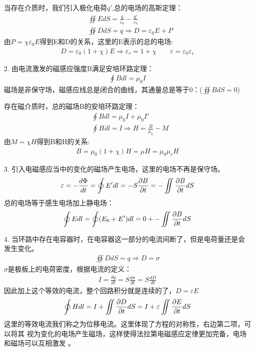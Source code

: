 \documentclass[UTF8]{article}
\numberwithin{equation}{section}
\begin{document}
当存在介质时，我们引入极化电荷$q'$,总的电场的高斯定理：
\begin{align*}
    &\oiint E dS = \frac{q}{\varepsilon_0}-\frac{q'}{\varepsilon_0}\\
    &\oiint D dS = q\Rightarrow D=\varepsilon_0 E+P
\end{align*}
由$P=\chi\varepsilon_0 E$得到E和D的关系，这里的E表示的总的电场:
\begin{align*}
    D = \varepsilon_0(1+\chi)E\Rightarrow \varepsilon_r=1+\chi\qquad \varepsilon=\varepsilon_0\varepsilon_r
\end{align*}

2. 由电流激发的磁感应强度B满足安培环路定理：
\begin{align*}
    \oint B dl =\mu_0 I
\end{align*}
磁场是非保守场，磁感应线总是闭合的曲线，其通量总是等于0：($\oiint B dS = 0$)

存在磁介质时，总的磁场B的安培环路定理：
\begin{align*}
    &\oint B dl = \mu_0 I +\mu_0 I'\\
    &\oint H dl = I\Rightarrow H=\frac{B}{\mu_0}-M
\end{align*}
由$M=\chi H$得到B和H的关系:
\begin{align*}
    B=\mu_0(1+\chi)H=\mu H=\mu_0\mu_r H
\end{align*}

3. 引入电磁感应当中的变化的磁场产生电场，这里的电场不再是保守场。
\begin{align*}
    \varepsilon=-\frac{d\Phi}{dt}=\oint E' dl = -S\frac{\partial B}{\partial t}=-\iint \pdv{B}{t} dS
\end{align*}
总的电场等于感生电场加上静电场：
\begin{align*}
    \oint E dl = \oint (E_0+E') dl =0+ -\iint \pdv{B}{t} dS
\end{align*}

4. 当环路中存在电容器时，在电容器这一部分的电流间断了，但是电荷量还是会发生变化。
\begin{align*}
     \oiint D dS = q\Rightarrow D = \sigma
\end{align*}
$\sigma$是极板上的电荷密度，根据电流的定义：
\begin{align*}
    I =\frac{dq}{dt}=S\frac{d\sigma}{dt}=S\frac{dD}{dt}
\end{align*}
因此加上这个等效的电流，整个回路积分就是连续的了，$D=\varepsilon E$
\begin{align*}
    \oint H dl = I+\iint \pdv{D}{t}dS=I+\varepsilon\iint  \pdv{E}{t}dS
\end{align*}
这里的等效电流我们称之为位移电流。这里体现了方程的对称性，右边第二项，可以将其
视为变化的电场产生磁场，这样使得法拉第电磁感应定律更加完备，电场和磁场可以互相激发
。
\end{document}
